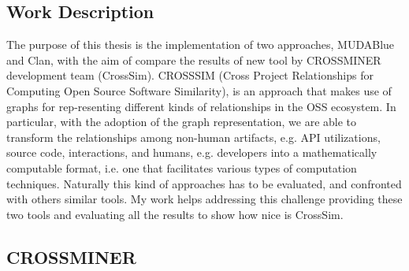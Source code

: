 \subsection{Work Description}
The purpose of this thesis is the implementation of two approaches, MUDABlue and Clan, with the aim of compare the results of new tool by CROSSMINER development team (CrossSim). CROSSSIM (Cross Project Relationships for Computing Open Source Software Similarity), is an approach that makes use of graphs for rep-resenting different kinds of relationships in the OSS ecosystem. In particular, with the adoption of the graph representation, we are able to transform the relationships among non-human artifacts, e.g. API utilizations, source code, interactions, and humans, e.g. developers into a mathematically computable format, i.e. one that
facilitates various types of computation techniques. Naturally this kind of approaches has to be evaluated, and confronted with others similar tools. My work helps addressing this challenge providing these two tools and evaluating all the results to show how nice is CrossSim. 

\subsection{CROSSMINER}

